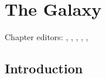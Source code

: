 
\chapter[TheGalaxy]{The Galaxy}
\def\chpname{galaxy}\label{chp:\chpname}

Chapter editors:
,
,
,
,
,



\section{Introduction}
\def\secname{MW_Intro}\label{sec:\secname}







\navigationbar

